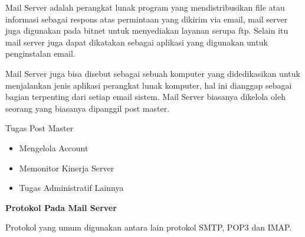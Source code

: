﻿Mail Server adalah perangkat lunak program yang mendistribusikan file atau informasi sebagai respons atas permintaan yang dikirim via email, mail server juga digunakan pada bitnet untuk menyediakan layanan serupa ftp. Selain itu mail server juga dapat dikatakan sebagai aplikasi yang digunakan untuk penginstalan email.  \par
\vspace{12pt}
Mail Server juga bisa disebut sebagai sebuah komputer yang didedikasikan untuk menjalankan jenis aplikasi perangkat lunak komputer, hal ini dianggap sebagai bagian terpenting dari setiap email sistem. Mail Server biasanya dikelola oleh seorang yang biasanya dipanggil post master. \par
\vspace{12pt}
\noindent 
Tugas Post Master  \par
\noindent 
\begin{itemize}
\item Mengelola Account \par
\noindent 
\item Memonitor Kinerja Server \par
\noindent 
\item Tugas Administratif Lainnya\end{itemize}
 \par
\vspace{12pt}
\vspace{12pt}
\noindent 
\textbf{Protokol Pada Mail Server} \par
\noindent 
Protokol yang umum digunakan antara lain protokol SMTP, POP3 dan IMAP. \par
\noindent 
